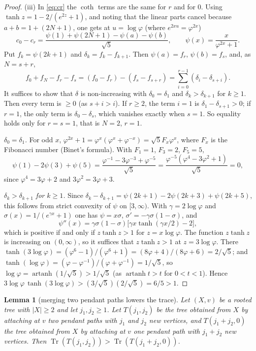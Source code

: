 \documentclass[11pt]{amsart}
\newtheorem{lemma}[theorem]{Lemma}
\theoremstyle{definition}
\theoremstyle{remark}
\newcommand{\Tr}{\operatorname{Tr}}
\begin{document}
\begin{proof}
(iii) In \eqref{eq:cr} the $\coth$ terms are the same for $r$ and for $0$.
Using $\tanh z=1-2/(e^{2z}+1)$, and noting that the linear parts cancel
because $a+b=1+(2N+1)$, one gets at $u=\log\varphi$ (where
$e^{2xu}=\varphi^{2x}$)
\[
c_0-c_r=\frac{\psi(1)+\psi(2N+1)-\psi(a)-\psi(b)}{\sqrt5},\qquad
\psi(x)=\frac{x}{\varphi^{2x}+1}.
\]
Put $f_k=\psi(2k+1)$ and $\delta_k=f_k-f_{k+1}$. Then $\psi(a)=f_r$,
$\psi(b)=f_s$, and, as $N=s+r$,
\[
f_0+f_N-f_r-f_s=(f_0-f_r)-(f_s-f_{s+r})=\sum_{i=0}^{r-1}(\delta_i-\delta_{s+i}).
\]
It suffices to show that $\delta$ is non-increasing with $\delta_0=\delta_1$
and $\delta_k>\delta_{k+1}$ for $k\ge1$. Then every term is $\ge0$ (as
$s+i>i$). If $r\ge2$, the term $i=1$ is $\delta_1-\delta_{s+1}>0$; if $r=1$,
the only term is $\delta_0-\delta_s$, which vanishes exactly when $s=1$. So
equality holds only for $r=s=1$, that is $N=2$, $r=1$.

\emph{$\delta_0=\delta_1$.} For odd $x$,
$\varphi^{2x}+1=\varphi^x(\varphi^x+\varphi^{-x})=\sqrt5F_x\varphi^x$, where
$F_x$ is the Fibonacci number (Binet's formula). With $F_1=1$, $F_3=2$,
$F_5=5$,
\[
\psi(1)-2\psi(3)+\psi(5)=\frac{\varphi^{-1}-3\varphi^{-3}+\varphi^{-5}}{\sqrt5}
=\frac{\varphi^{-5}(\varphi^4-3\varphi^2+1)}{\sqrt5}=0,
\]
since $\varphi^4=3\varphi+2$ and $3\varphi^2=3\varphi+3$.

\emph{$\delta_k>\delta_{k+1}$ for $k\ge1$.} Since
$\delta_k-\delta_{k+1}=\psi(2k+1)-2\psi(2k+3)+\psi(2k+5)$, this follows from
strict convexity of $\psi$ on $[3,\infty)$. With $\gamma=2\log\varphi$ and
$\sigma(x)=1/(e^{\gamma x}+1)$ one has $\psi=x\sigma$,
$\sigma'=-\gamma\sigma(1-\sigma)$, and
\[
\psi''(x)=\gamma\sigma(1-\sigma)\bigl[\gamma x\tanh(\gamma x/2)-2\bigr],
\]
which is positive if and only if $z\tanh z>1$ for $z=x\log\varphi$. The
function $z\tanh z$ is increasing on $(0,\infty)$, so it suffices that
$z\tanh z>1$ at $z=3\log\varphi$. There
$\tanh(3\log\varphi)=(\varphi^6-1)/(\varphi^6+1)=(8\varphi+4)/(8\varphi+6)=2/\sqrt5$;
and $\tanh(\log\varphi)=(\varphi-\varphi^{-1})/(\varphi+\varphi^{-1})=1/\sqrt5$,
so $\log\varphi=\operatorname{artanh}(1/\sqrt5)>1/\sqrt5$ (as
$\operatorname{artanh}t>t$ for $0<t<1$). Hence
$3\log\varphi\,\tanh(3\log\varphi)>(3/\sqrt5)(2/\sqrt5)=6/5>1$.
\end{proof}

\begin{lemma}[merging two pendant paths lowers the trace]\label{lem:S45}
Let $(X,v)$ be a rooted tree with $|X|\ge2$ and let $j_1,j_2\ge1$. Let
$T(j_1,j_2)$ be the tree obtained from $X$ by attaching at $v$ two pendant
paths with $j_1$ and $j_2$ new vertices, and $T(j_1+j_2,0)$ the tree
obtained from $X$ by attaching at $v$ one pendant path with $j_1+j_2$ new
vertices. Then $\Tr(T(j_1,j_2))>\Tr(T(j_1+j_2,0))$.
\end{lemma}
\end{document}
